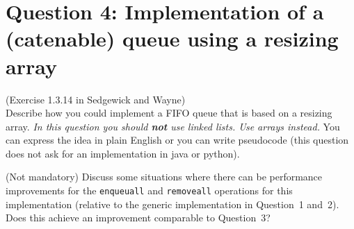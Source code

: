 \documentclass{tufte-handout}
\begin{document}
\section{\textbf{Question 4}: Implementation of a (catenable) queue using a resizing array}


(Exercise 1.3.14 in Sedgewick and Wayne)\\
Describe how you could implement a FIFO queue that is based on a resizing array.
\emph{In this question you should \textbf{not} use linked lists.  Use arrays instead.}
You can express the idea in plain English or you can write pseudocode (this question does not ask for an implementation in java or python).

(Not mandatory) Discuss some situations where there can be performance improvements for the \texttt{enqueuall} and \texttt{removeall} operations for this implementation (relative to the generic implementation in Question~1 and~2).
Does this achieve an improvement comparable to Question~3?
\end{document}
